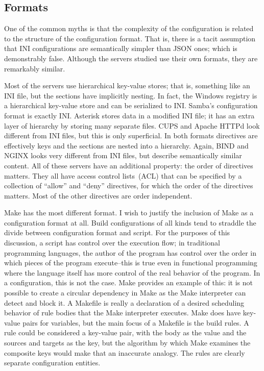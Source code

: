 \documentclass[letterpaper,twocolumn,10pt]{article}
\begin{document}
\subsection{Formats}
One of the common myths is that the complexity of the configuration is related to the structure of the configuration format. That is, there is a tacit assumption that INI configurations are semantically simpler than JSON ones; which is demonstrably false. Although the servers studied use their own formats, they are remarkably similar.

Most of the servers use hierarchical key-value stores; that is, something like an INI file, but the sections have implicitly nesting. In fact, the Windows registry is a hierarchical key-value store and can be serialized to INI. Samba's configuration format is exactly INI.\cite{samba} Asterisk stores data in a modified INI file; it has an extra layer of hierarchy by storing many separate files.\cite{asterisk} CUPS and Apache HTTPd look different from INI files, but this is only superficial. In both formats directives are effectively keys and the sections are nested into a hierarchy.\cite{cups,apache} Again, BIND and NGINX looks very different from INI files, but describe semantically similar content.\cite{bind,nginx} All of these servers have an additional property: the order of directives matters. They all have access control lists~(ACL) that can be specified by a collection of ``allow'' and ``deny'' directives, for which the order of the directives matters. Most of the other directives are order independent.

Make has the most different format. I wish to justify the inclusion of Make as a configuration format at all. Build configurations of all kinds tend to straddle the divide between configuration format and script. For the purposes of this discussion, a script has control over the execution flow; in traditional programming languages, the author of the program has control over the order in which pieces of the program execute--this is true even in functional programming where the language itself has more control of the real behavior of the program. In a configuration, this is not the case. Make provides an example of this: it is not possible to create a circular dependency in Make as the Make interpreter can detect and block it. A Makefile is really a declaration of a desired scheduling behavior of rule bodies that the Make interpreter executes. Make does have key-value pairs for variables, but the main focus of a Makefile is the build rules. A rule could be considered a key-value pair, with the body as the value and the sources and targets as the key, but the algorithm by which Make examines the composite keys would make that an inaccurate analogy. The rules are clearly separate configuration entities.
\end{document}
